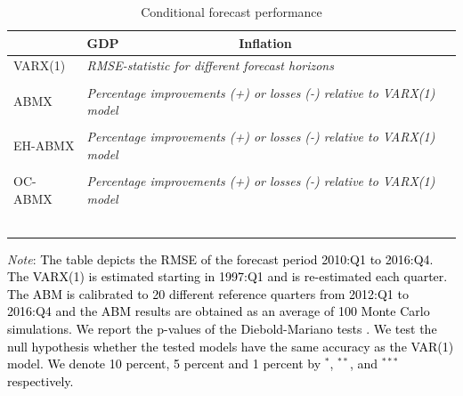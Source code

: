 \begin{table}[!h]
	\caption{Conditional forecast performance} 
	\label{table:rmse_ed_validation_abmx}
	\centering
		\begin{tabular}{lll}
			\toprule
			& GDP & Inflation \\
			\midrule
			VARX(1) & \multicolumn{2}{l}{\textit{RMSE-statistic for different forecast horizons}} \\ \midrule
			
            \\ \midrule
   			ABMX & \multicolumn{2}{l}{\textit{Percentage improvements (+) or losses (-) relative to VARX(1) model}} \\	\midrule 
			\\ \midrule 
            EH-ABMX & \multicolumn{2}{l}{\textit{Percentage improvements (+) or losses (-) relative to VARX(1) model}} \\	\midrule 
			\\ \midrule 
			OC-ABMX & \multicolumn{2}{l}{\textit{Percentage improvements (+) or losses (-) relative to VARX(1) model}} \\	\midrule 
			\\ \bottomrule \
		\end{tabular}
	\begin{tablenotes}
		\footnotesize \item \textit{Note}: \textcolor{black}{The table depicts the RMSE of the forecast period 2010:Q1 to 201\textcolor{black}{6}:Q4. The VARX(1) is estimated starting in 1997:Q1 and is re-estimated each quarter. The ABM is calibrated to \textcolor{black}{20} different reference quarters from 2012:Q1 to \textcolor{black}{2016:Q4} and the ABM results are obtained as an average of 100 Monte Carlo simulations. We report the p-values of the Diebold-Mariano tests \citep{harveyTestingEqualityPrediction1997}.  We test the null hypothesis whether the tested models have the same accuracy as the VAR(1) model. We denote  10 percent, 5 percent and 1 percent by $^{*}$, $^{**}$, and $^{***}$ respectively.}
	\end{tablenotes}
\end{table}

